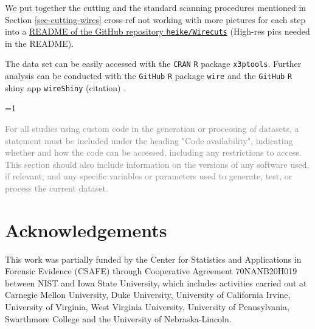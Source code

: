 \documentclass[fleqn,10pt]{wlscirep}
\newcommand{\tom}[1]{{\textcolor{RedOrange}{#1}}}
\newcommand{\ifinstruction}{0} %
\begin{document}
We put together the cutting and the standard scanning procedures
mentioned in Section \ref{sec-cutting-wires} \tom{cross-ref not working}
with more pictures for each step into a
\href{https://github.com/heike/Wirecuts/blob/main/README.md}{README of the GitHub repository \texttt{heike/Wirecuts}}
\tom{(High-res pics needed in the README)}.

The data set can be easily accessed with the \texttt{CRAN} \texttt{R}
package \texttt{x3ptools}. Further analysis can be conducted with the
\texttt{GitHub} \texttt{R} package \texttt{wire} and the \texttt{GitHub}
\texttt{R} shiny app \texttt{wireShiny} \tom{(citation)} .

\ifnum \ifinstruction=1

\textcolor{gray}{For all studies using custom code in the generation or processing of datasets, a statement must be included under the heading "Code availability", indicating whether and how the code can be accessed, including any restrictions to access. This section should also include information on the versions of any software used, if relevant, and any specific variables or parameters used to generate, test, or process the current dataset.}
\fi




\section*{Acknowledgements} 
This work was partially funded by the Center for Statistics and
Applications in Forensic Evidence (CSAFE) through Cooperative Agreement
70NANB20H019 between NIST and Iowa State University, which includes
activities carried out at Carnegie Mellon University, Duke University,
University of California Irvine, University of Virginia, West Virginia
University, University of Pennsylvania, Swarthmore College and the
University of Nebraska-Lincoln.
\end{document}
